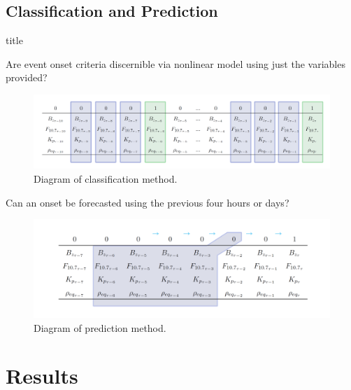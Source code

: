 \documentclass[xcolor={dvipsnames,table}]{beamer}
\newcommand{\subheader}{    		\begin{center}
  	\begin{beamercolorbox}[sep=4pt,center,shadow=true,rounded=true]{title}
  		\usebeamerfont{title}\subsecname\par%
  	\end{beamercolorbox}
  	\vfill
  	\end{center}}
\begin{document}
\subsection{Classification and Prediction}

\begin{frame}
	\subheader
	Are event onset criteria discernible via nonlinear model using just the variables provided?
	\begin{figure}[htp!]
		\centering
		\includegraphics[width=1\linewidth]{Figures/CH5/ClassifyGraphic-2.png}
		\caption{Diagram of classification method.}
		\label{fig:ClassifyDiagram}
	\end{figure}
\end{frame}


\begin{frame}
	Can an onset be forecasted using the previous four hours or days?
	\begin{figure}[htp!]
		\centering
		\includegraphics[width=1\linewidth]{Figures/CH5/FullGraphic-2.png}
		\caption{Diagram of prediction method.}
		\label{fig:ClassifyDiagram}
	\end{figure}
	
	
\end{frame}

\section{Results}
\end{document}
